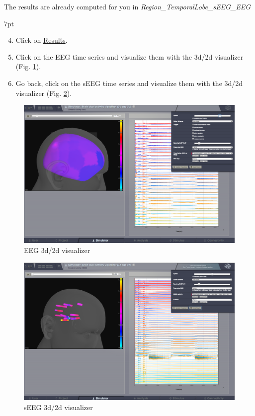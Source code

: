 \documentclass{tufte-handout}
\newenvironment{simulation}{%
  \def\FrameCommand{%
    \hspace{1pt}%
    {\color{ForestGreen}\vrule width 2pt}%
    {\color{simulationshade}\vrule width 4pt}%
    \colorbox{simulationshade}%
  }%
  \MakeFramed{\advance\hsize-\width\FrameRestore}%
  \noindent\hspace{-4.55pt}%
  \begin{adjustwidth}{}{7pt}%
  \vspace{2pt}\vspace{2pt}%
}
{%
  \vspace{2pt}\end{adjustwidth}\endMakeFramed%
}
\begin{document}
The results are already computed for you in \textit{Region\_TemporalLobe\_sEEG\_EEG}


\begin{simulation}
  \begin{enumerate}
    \setcounter{enumi}{3}
  \item Click on \underline{Results}.
  \item Click on the EEG time series and visualize them with the 3d/2d visualizer (Fig. \ref{fig:EEG}).
  \item Go back, click on the sEEG time series and visualize them with the 3d/2d visualizer (Fig. \ref{fig:sEEG}).
\end{enumerate}
\end{simulation}



\begin{figure}[h]
  \includegraphics[width=\linewidth]{Handout_UI_ModellingEpilepsy_EEG3d2d}%
  \caption{EEG 3d/2d visualizer}%
  \label{fig:EEG}%
\end{figure}

\begin{figure}[h]
  \includegraphics[width=\linewidth]{Handout_UI_ModellingEpilepsy_sEEG3d2d}%
  \caption{sEEG 3d/2d visualizer}%
  \label{fig:sEEG}%
\end{figure} 
\end{document}

